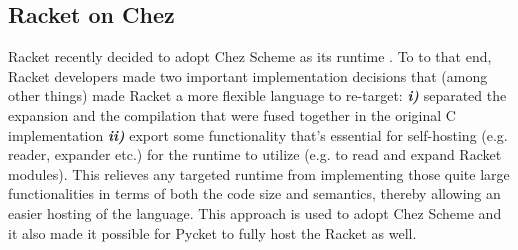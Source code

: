 \subsection{Racket on Chez}

Racket recently decided to adopt Chez Scheme as its runtime
\cite{racket-on-chez-19}. To to that end, Racket developers made two
important implementation decisions that (among other things) made
Racket a more flexible language to re-target: \textit{\textbf{i)}}
separated the expansion and the compilation that were fused together
in the original C implementation \textit{\textbf{ii)}} export some
functionality that's essential for self-hosting (e.g. reader, expander
etc.) for the runtime to utilize (e.g. to read and expand Racket
modules). This relieves any targeted runtime from implementing those
quite large functionalities in terms of both the code size and
semantics, thereby allowing an easier hosting of the language. This
approach is used to adopt Chez Scheme and it also made it possible for
Pycket to fully host the Racket as well.
